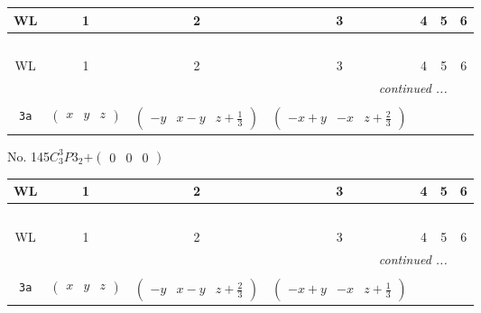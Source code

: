 \documentclass[fleqn,9pt,landscape]{jsarticle}
\begin{document}
\begin{center}
\renewcommand{\arraystretch}{1.2}
\begin{longtable}{ccccccc}
 \hline \hline
WL & 1 & 2 & 3 & 4 & 5 & 6 \\ \hline \endfirsthead

\multicolumn{6}{l}{\tablename\ \thetable{}} \\
 \hline \hline
WL & 1 & 2 & 3 & 4 & 5 & 6 \\ \hline \endhead

 \hline \hline
\multicolumn{6}{r}{\footnotesize\it continued ...} \\ \endfoot

 \hline \hline
\multicolumn{6}{r}{} \\ \endlastfoot

{\tt 3a} & $ \begin{pmatrix} x & y & z \end{pmatrix} $ & $ \begin{pmatrix} - y & x - y & z + \frac{1}{3} \end{pmatrix} $ & $ \begin{pmatrix} - x + y & - x & z + \frac{2}{3} \end{pmatrix} $ \\
\end{longtable}
\end{center}
\newpage
No. 145\quad$C_{3}^{3}$\quad$P3_2$\quad[ trigonal ]\quad$+\begin{pmatrix} 0 & 0 & 0 \end{pmatrix}$
\begin{center}
\renewcommand{\arraystretch}{1.2}
\begin{longtable}{ccccccc}
 \hline \hline
WL & 1 & 2 & 3 & 4 & 5 & 6 \\ \hline \endfirsthead

\multicolumn{6}{l}{\tablename\ \thetable{}} \\
 \hline \hline
WL & 1 & 2 & 3 & 4 & 5 & 6 \\ \hline \endhead

 \hline \hline
\multicolumn{6}{r}{\footnotesize\it continued ...} \\ \endfoot

 \hline \hline
\multicolumn{6}{r}{} \\ \endlastfoot

{\tt 3a} & $ \begin{pmatrix} x & y & z \end{pmatrix} $ & $ \begin{pmatrix} - y & x - y & z + \frac{2}{3} \end{pmatrix} $ & $ \begin{pmatrix} - x + y & - x & z + \frac{1}{3} \end{pmatrix} $ \\
\end{longtable}
\end{center}
\end{document}
